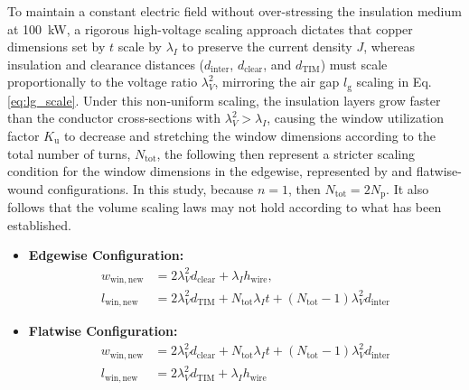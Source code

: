 To maintain a constant electric field without over-stressing the insulation medium at 100~kW, a rigorous high-voltage scaling approach dictates that copper dimensions set by $t$ scale by $\lambda_I$ to preserve the current density $J$, whereas insulation and clearance distances ($d_{\mathrm{inter}}$, $d_{\mathrm{clear}}$, and $d_{\mathrm{TIM}}$) must scale proportionally to the voltage ratio $\lambda_V^2$, mirroring the air gap $l_{\mathrm{g}}$ scaling in Eq. \ref{eq:lg_scale}. Under this non-uniform scaling, the insulation layers grow faster than the conductor cross-sections with  $\lambda_V^2 > \lambda_I$, causing the window utilization factor $K_{\mathrm{u}}$ to decrease and stretching the window dimensions according to the total number of turns, $N_{\mathrm{tot}}$, the following then represent a stricter scaling condition for the window dimensions in the edgewise, represented by and flatwise-wound configurations. In this study, because $n=1$, then $N_\mathrm{tot} = 2 N_\mathrm{p}$. It also follows that the volume scaling laws may not hold according to what has been established.
\begin{itemize}
    \item \textbf{Edgewise Configuration:}
    \begin{align}
        w_{\mathrm{win,new}} &= 2\lambda_V^2 d_{\mathrm{clear}} + \lambda_I h_{\mathrm{wire}}, \\
        l_{\mathrm{win,new}} &= 2\lambda_V^2 d_{\mathrm{TIM}} + N_{\mathrm{tot}}\lambda_I t + (N_{\mathrm{tot}} - 1)\lambda_V^2 d_{\mathrm{inter}}
    \end{align}
    \item \textbf{Flatwise Configuration:}
    \begin{align}
        w_{\mathrm{win,new}} &= 2\lambda_V^2 d_{\mathrm{clear}} + N_{\mathrm{tot}}\lambda_I t + (N_{\mathrm{tot}} - 1)\lambda_V^2 d_{\mathrm{inter}} \\
        l_{\mathrm{win,new}} &= 2\lambda_V^2 d_{\mathrm{TIM}} + \lambda_I h_{\mathrm{wire}}
    \end{align}
\end{itemize}

